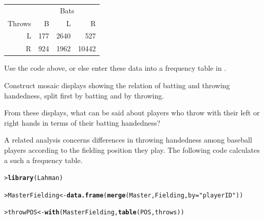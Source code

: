 \documentclass[10pt,krantz2]{krantz}\usepackage[]{graphicx}\usepackage[]{color}
\makeatletter
\newcommand{\hlstr}[1]{\textcolor[rgb]{0.192,0.494,0.8}{#1}}%
\newcommand{\hlstd}[1]{\textcolor[rgb]{0.345,0.345,0.345}{#1}}%
\newcommand{\hlkwb}[1]{\textcolor[rgb]{0.69,0.353,0.396}{#1}}%
\newcommand{\hlkwc}[1]{\textcolor[rgb]{0.333,0.667,0.333}{#1}}%
\newcommand{\hlkwd}[1]{\textcolor[rgb]{0.737,0.353,0.396}{\textbf{#1}}}%
\newenvironment{kframe}{%
 \def\at@end@of@kframe{}%
 \ifinner\ifhmode%
  \def\at@end@of@kframe{\end{minipage}}%
  \begin{minipage}{\columnwidth}%
 \fi\fi%
 \def\FrameCommand##1{\hskip\@totalleftmargin \hskip-\fboxsep
 \colorbox{shadecolor}{##1}\hskip-\fboxsep
     \hskip-\linewidth \hskip-\@totalleftmargin \hskip\columnwidth}%
 \MakeFramed {\advance\hsize-\width
   \@totalleftmargin\z@ \linewidth\hsize
   \@setminipage}}%
 {\par\unskip\endMakeFramed%
 \at@end@of@kframe}
\newenvironment{knitrout}{}{} %
\renewenvironment{knitrout}{\small\renewcommand{\baselinestretch}{.85}}{} %
\makeatother
\begin{document}
\begin{Exercises}
\begin{table}[ht]
\centering
\begin{tabular}{rrrr}
  \hline
       & \multicolumn{3}{c}{Bats} \\
Throws & B & L & R \\ 
  \hline
  L & 177 & 2640 & 527 \\ 
  R & 924 & 1962 & 10442 \\ 
   \hline
\end{tabular}
\end{table}
  \begin{itemize*}
    \item Use the code above, or else enter these data into a frequency table in \R.
    \item Construct mosaic displays showing the relation of batting and throwing handedness, split first by batting and by throwing.
    \item From these displays, what can be said about players who throw with their left
    or right hands in terms of their batting handedness? 
  \end{itemize*}

\exercise\hard
A related analysis concerns differences in throwing handedness among baseball players
according to the fielding position they play.  The following code calculates a
such a frequency table.

\begin{knitrout}
\color{fgcolor}\begin{kframe}
\begin{alltt}
\hlstd{> }\hlkwd{library}\hlstd{(Lahman)}
\end{alltt}


{\ttfamily\noindent\bfseries\color{errorcolor}{Error in library(Lahman): there is no package called 'Lahman'}}\begin{alltt}
\hlstd{> }\hlstd{MasterFielding} \hlkwb{<-} \hlkwd{data.frame}\hlstd{(}\hlkwd{merge}\hlstd{(Master, Fielding,} \hlkwc{by}\hlstd{=}\hlstr{"playerID"}\hlstd{))}
\end{alltt}


{\ttfamily\noindent\bfseries{}}\begin{alltt}
\hlstd{> }\hlstd{throwPOS} \hlkwb{<-} \hlkwd{with}\hlstd{(MasterFielding,} \hlkwd{table}\hlstd{(POS, throws))}
\end{alltt}



\end{kframe}
\end{knitrout}
\end{Exercises}
\end{document}
